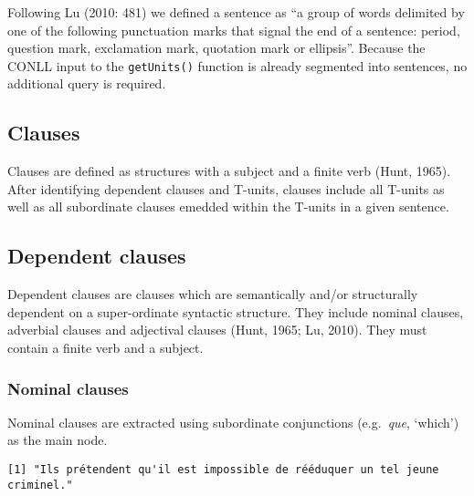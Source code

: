 \documentclass[
]{article}
\newenvironment{Shaded}{\begin{snugshade}}{\end{snugshade}}
\newcommand{\CommentTok}[1]{\textcolor[rgb]{0.56,0.35,0.01}{\textit{#1}}}
\newcommand{\DataTypeTok}[1]{\textcolor[rgb]{0.13,0.29,0.53}{#1}}
\newcommand{\KeywordTok}[1]{\textcolor[rgb]{0.13,0.29,0.53}{\textbf{#1}}}
\newcommand{\NormalTok}[1]{#1}
\newcommand{\OtherTok}[1]{\textcolor[rgb]{0.56,0.35,0.01}{#1}}
\newcommand{\StringTok}[1]{\textcolor[rgb]{0.31,0.60,0.02}{#1}}
\begin{document}
Following Lu (2010: 481) we defined a sentence as ``a group of words
delimited by one of the following punctuation marks that signal the end
of a sentence: period, question mark, exclamation mark, quotation mark
or ellipsis''. Because the CONLL input to the \texttt{getUnits()}
function is already segmented into sentences, no additional query is
required.

\hypertarget{clauses}{%
\subsection{Clauses}\label{clauses}}

Clauses are defined as structures with a subject and a finite verb
(Hunt, 1965). After identifying dependent clauses and T-units, clauses
include all T-units as well as all subordinate clauses emedded within
the T-units in a given sentence.

\hypertarget{dep-clauses}{%
\subsection{Dependent clauses}\label{dep-clauses}}

Dependent clauses are clauses which are semantically and/or structurally
dependent on a super-ordinate syntactic structure. They include nominal
clauses, adverbial clauses and adjectival clauses (Hunt, 1965; Lu,
2010). They must contain a finite verb and a subject.

\hypertarget{nomclause}{%
\subsubsection{Nominal clauses}\label{nomclause}}

Nominal clauses are extracted using subordinate conjunctions
(e.g.~\emph{que}, `which') as the main node.

\begin{verbatim}
[1] "Ils prétendent qu'il est impossible de rééduquer un tel jeune criminel."
\end{verbatim}

\begin{Shaded}
\end{Shaded}
\end{document}
